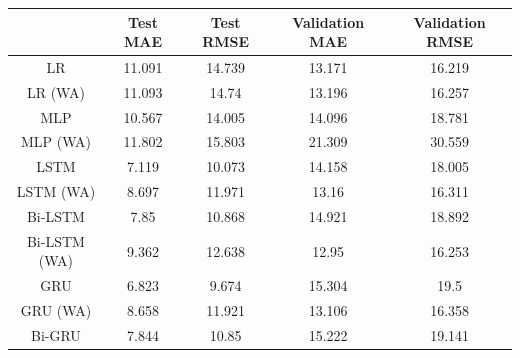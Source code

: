 \begin{table}[p]
    \renewcommand{\arraystretch}{1.5}
    \begin{center}
        \footnotesize
        \begin{tabular}{ |c|c|c|c|c| }
            \hline
            & Test MAE                  & Test RMSE                  & Validation MAE             & Validation RMSE            \\
            \hline
            LR           & \cellcolor{red!10}11.091  & \cellcolor{red!10}14.739   & 13.171                     & \cellcolor{green!30}16.219 \\
            \hline
            LR (WA)      & \cellcolor{red!20}11.093  & \cellcolor{red!20}14.74    & 13.196                     & 16.257                     \\
            \hline
            MLP          & 10.567                    & 14.005                     & 14.096                     & 18.781                     \\
            \hline
            MLP (WA)     & \cellcolor{red!30}11.802  & \cellcolor{red!30}15.803   & \cellcolor{red!30}21.309   & \cellcolor{red!30}30.559   \\
            \hline
            LSTM         & \cellcolor{green!10}7.119 & \cellcolor{green!10}10.073 & 14.158                     & 18.005                     \\
            \hline
            LSTM (WA)    & 8.697                     & 11.971                     & 13.16                      & 16.311                     \\
            \hline
            Bi-LSTM      & 7.85                      & 10.868                     & 14.921                     & \cellcolor{red!10}18.892   \\
            \hline
            Bi-LSTM (WA) & 9.362                     & 12.638                     & \cellcolor{green!30}12.95  & \cellcolor{green!10}16.253 \\
            \hline
            GRU          & \cellcolor{green!20}6.823 & \cellcolor{green!20}9.674  & \cellcolor{red!20}15.304   & 19.5                       \\
            \hline
            GRU (WA)     & 8.658                     & 11.921                     & \cellcolor{green!10}13.106 & 16.358                     \\
            \hline
            Bi-GRU       & 7.844                     & 10.85                      & \cellcolor{red!10}15.222   & \cellcolor{red!20}19.141   \\

\end{tabular}
\end{center}
\end{table}
